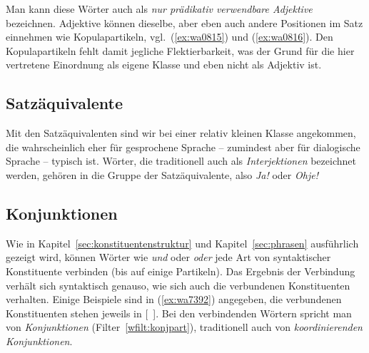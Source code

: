 Man kann diese Wörter auch als \textit{nur prädikativ verwendbare Adjektive} bezeichnen.
Adjektive können dieselbe, aber eben auch andere Positionen im Satz einnehmen wie Kopulapartikeln, vgl.\ (\ref{ex:wa0815}) und (\ref{ex:wa0816}).
Den Kopulapartikeln fehlt damit jegliche Flektierbarkeit, was der Grund für die hier vertretene Einordnung als eigene Klasse und eben nicht als Adjektiv ist.

\begin{exe}
  \ex\label{ex:wa0815}
  \begin{xlist}
  \end{xlist}
  \ex\label{ex:wa0816}
  \begin{xlist}
  \end{xlist}
\end{exe}


\subsection{Satzäquivalente}

\label{sec:satzaequivalentewortklassen}


Mit den Satzäquivalenten sind wir bei einer relativ kleinen Klasse angekommen, die wahrscheinlich eher für gesprochene Sprache -- zumindest aber für dialogische Sprache -- typisch ist.
Wörter, die traditionell auch als \textit{Interjektionen} bezeichnet werden, gehören in die Gruppe der Satzäquivalente, also \textit{Ja!} oder \textit{Ohje!}


\subsection{Konjunktionen}

\label{sec:konjunktionenwortklassen}


Wie in Kapitel~\ref{sec:konstituentenstruktur} und Kapitel~\ref{sec:phrasen} ausführlich gezeigt wird, können Wörter wie \textit{und} oder \textit{oder} jede Art von syntaktischer Konstituente verbinden (bis auf einige Partikeln).
Das Ergebnis der Verbindung verhält sich syntaktisch genauso, wie sich auch die verbundenen Konstituenten verhalten.
Einige Beispiele sind in (\ref{ex:wa7392}) angegeben, die verbundenen Konstituenten stehen jeweils in [~].
Bei den verbindenden Wörtern spricht man von \textit{Konjunktionen} (Filter~\ref{wfilt:konjpart}), traditionell auch von \textit{koordinierenden Konjunktionen}.

